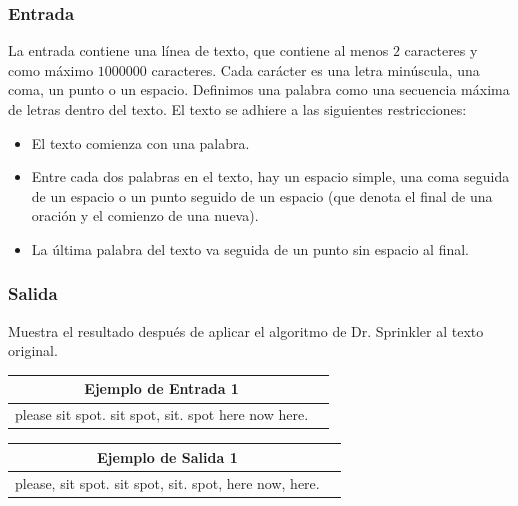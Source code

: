 \documentclass[12pt]{article}
\newcommand{\nl}{\vspace{0.3cm}}
\begin{document}
\subsubsection{Entrada}

La entrada contiene una línea de texto, que contiene al menos $2$ caracteres y como máximo $1000000$ caracteres. Cada carácter es una letra minúscula, una coma, un punto o un espacio. Definimos una palabra como una secuencia máxima de letras dentro del texto. El texto se adhiere a las siguientes restricciones:

\begin{itemize}
	\item El texto comienza con una palabra.
	\item Entre cada dos palabras en el texto, hay un espacio simple, una coma seguida de un espacio o un punto seguido de un espacio (que denota el final de una oración y el comienzo de una nueva).
	\item La última palabra del texto va seguida de un punto sin espacio al final.
\end{itemize}

\subsubsection{Salida}

Muestra el resultado después de aplicar el algoritmo de Dr. Sprinkler al texto original.

\begin{center}

	\nl
	
	\begin{tabular}{|c|c|}
		\hline Ejemplo de Entrada 1\\ 
		\hline please sit spot. sit spot, sit. spot here now here.\\
		\hline 
	\end{tabular} 
	
	\nl
	
	\begin{tabular}{|c|c|}
		\hline Ejemplo de Salida 1\\ 
		\hline please, sit spot. sit spot, sit. spot, here now, here.\\ 
		\hline 
	\end{tabular} 

\end{center}
\end{document}
